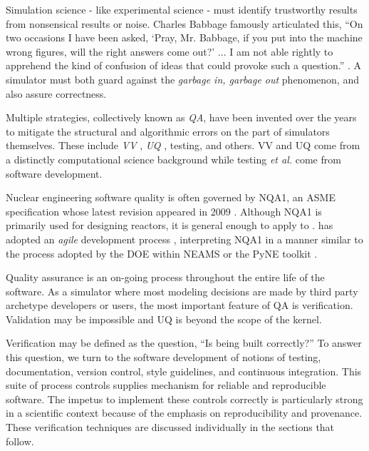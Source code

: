 
Simulation science - like experimental science - must identify trustworthy
results from nonsensical results or noise.
Charles Babbage famously articulated this, ``On two occasions I have been asked,
`Pray, Mr. Babbage, if you put into the machine wrong figures, will the right
answers come out?' ... I am not able rightly to apprehend the kind of confusion
of ideas that could provoke such a question.'' \cite{babbage_passages_2011}.
A simulator must both guard against the \emph{garbage in, garbage out} phenomenon, and also assure correctness.

Multiple strategies, collectively known as \emph{\gls{QA}}, have
been invented over the years to mitigate the structural and algorithmic errors
on the part of simulators themselves. These include \emph{\gls{VV}}
\cite{boehm_software_1989}, \emph{\gls{UQ}}
\cite{sacks_design_1989}, testing, and others. \gls{VV} and \gls{UQ} come from
a distinctly computational science background while testing \emph{et al.} come from software development.

Nuclear engineering software quality is often governed by \gls{NQA1}, an
\gls{ASME} specification
whose latest revision appeared in 2009 \cite{asme_nqa-1a-2009_2009}.
Although \gls{NQA1} is primarily
used for designing reactors, it is general enough to apply to
\Cyclus. \Cyclus has adopted an \emph{agile} development process
\cite{larman_agile_2004},
interpreting \gls{NQA1} in a manner similar to the process adopted by the
\gls{DOE} within \gls{NEAMS} \cite{neams_nuclear_2013} or the
PyNE toolkit \cite{biondo_quality_2014}.

Quality assurance is an on-going process throughout the
entire life of the software. As a simulator where most modeling decisions are made
by third party archetype developers or users, the most important feature of
\gls{QA} is verification. Validation may be impossible and \gls{UQ} is beyond
the scope of the kernel.

Verification may be defined as the question, ``Is \Cyclus being built correctly?''
To answer this question, we turn to the software development of notions of testing,
documentation, version control, style guidelines, and continuous integration.
This suite of process controls supplies mechanism for reliable and reproducible
software. The impetus to implement these controls correctly is particularly strong in a scientific
context because of the emphasis on reproducibility and provenance. These verification techniques are
discussed individually in the sections that follow.

